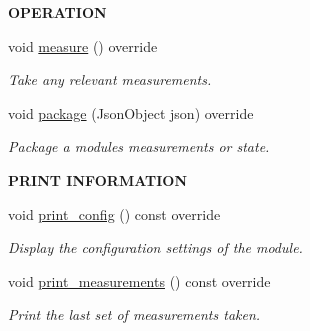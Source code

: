 \begin{Indent}{\bf O\+P\+E\+R\+A\+T\+I\+ON}\par
\begin{DoxyCompactItemize}
\item 
void \hyperlink{class_loom___a_d_s1115_acb67c9e3b562c8a1f03ed5a031dfa3ef}{measure} () override
\begin{DoxyCompactList}\small\item\em Take any relevant measurements. \end{DoxyCompactList}\item 
void \hyperlink{class_loom___a_d_s1115_a4c2a1f5b61f51cf5485598d8d36c6e3d}{package} (Json\+Object json) override
\begin{DoxyCompactList}\small\item\em Package a modules measurements or state. \end{DoxyCompactList}\end{DoxyCompactItemize}
\end{Indent}
\begin{Indent}{\bf P\+R\+I\+NT I\+N\+F\+O\+R\+M\+A\+T\+I\+ON}\par
\begin{DoxyCompactItemize}
\item 
void \hyperlink{class_loom___a_d_s1115_a8c5419d33482990e84be15dfe82b0ea6}{print\+\_\+config} () const override
\begin{DoxyCompactList}\small\item\em Display the configuration settings of the module. \end{DoxyCompactList}\item 
void \hyperlink{class_loom___a_d_s1115_a91ac5a218d357d6fa362f028ac922965}{print\+\_\+measurements} () const override
\begin{DoxyCompactList}\small\item\em Print the last set of measurements taken. \end{DoxyCompactList}\end{DoxyCompactItemize}
\end{Indent}
